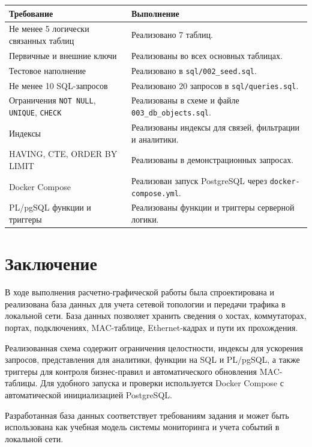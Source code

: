 \documentclass[12pt,a4paper]{article}
\begin{document}
\begin{longtable}{|p{8cm}|p{6.5cm}|}
\hline
\textbf{Требование} & \textbf{Выполнение}\\
\hline
Не менее 5 логически связанных таблиц & Реализовано 7 таблиц.\\
\hline
Первичные и внешние ключи & Реализованы во всех основных таблицах.\\
\hline
Тестовое наполнение & Реализовано в \texttt{sql/002\_seed.sql}.\\
\hline
Не менее 10 SQL-запросов & Реализовано 20 запросов в \texttt{sql/queries.sql}.\\
\hline
Ограничения \texttt{NOT NULL}, \texttt{UNIQUE}, \texttt{CHECK} & Реализованы в схеме и файле \texttt{003\_db\_objects.sql}.\\
\hline
Индексы & Реализованы индексы для связей, фильтрации и аналитики.\\
\hline
HAVING, CTE, ORDER BY LIMIT & Реализованы в демонстрационных запросах.\\
\hline
Docker Compose & Реализован запуск PostgreSQL через \texttt{docker-compose.yml}.\\
\hline
PL/pgSQL функции и триггеры & Реализованы функции и триггеры серверной логики.\\
\hline
\end{longtable}

\section{Заключение}

В ходе выполнения расчетно-графической работы была спроектирована и реализована база данных для учета сетевой топологии и передачи трафика в локальной сети. База данных позволяет хранить сведения о хостах, коммутаторах, портах, подключениях, MAC-таблице, Ethernet-кадрах и пути их прохождения.

Реализованная схема содержит ограничения целостности, индексы для ускорения запросов, представления для аналитики, функции на SQL и PL/pgSQL, а также триггеры для контроля бизнес-правил и автоматического обновления MAC-таблицы. Для удобного запуска и проверки используется Docker Compose с автоматической инициализацией PostgreSQL.

Разработанная база данных соответствует требованиям задания и может быть использована как учебная модель системы мониторинга и учета событий в локальной сети.
\end{document}
